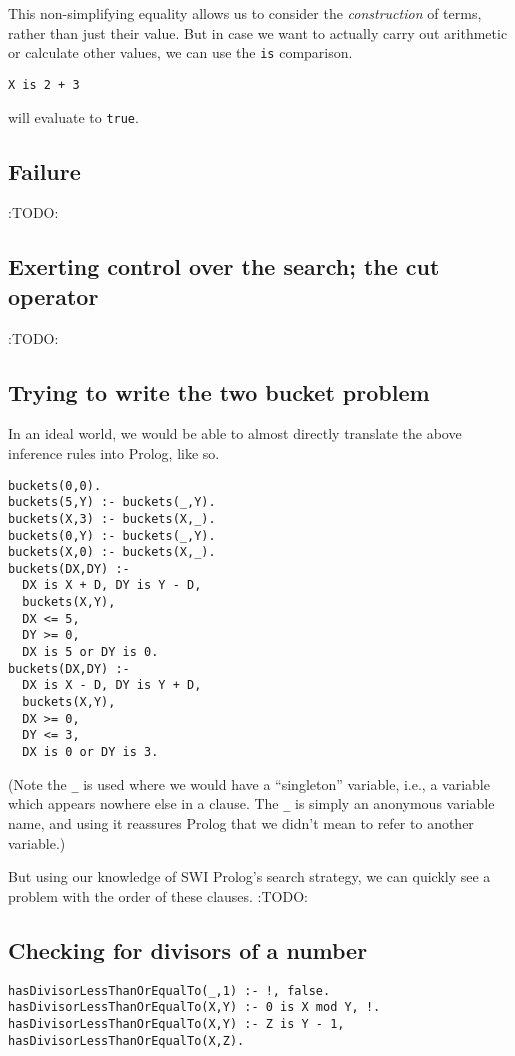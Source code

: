 \documentclass[11pt]{article}
\begin{document}
This non-simplifying equality allows us to consider
the \emph{construction} of terms, rather than just their value.
But in case we want to actually carry out arithmetic
or calculate other values,
we can use the \texttt{is} comparison.
\begin{verbatim}
X is 2 + 3
\end{verbatim}
will evaluate to \texttt{true}.

\subsection{Failure}
\label{sec:org929b371}
:TODO:

\subsection{Exerting control over the search; the cut operator}
\label{sec:org8ddaa0a}
:TODO:

\subsection{Trying to write the two bucket problem}
\label{sec:org4614fb2}
In an ideal world, we would be able to almost directly translate
the above inference rules into Prolog, like so.
\begin{verbatim}
buckets(0,0).
buckets(5,Y) :- buckets(_,Y).
buckets(X,3) :- buckets(X,_).
buckets(0,Y) :- buckets(_,Y).
buckets(X,0) :- buckets(X,_).
buckets(DX,DY) :-
  DX is X + D, DY is Y - D,
  buckets(X,Y),
  DX <= 5,
  DY >= 0,
  DX is 5 or DY is 0.
buckets(DX,DY) :-
  DX is X - D, DY is Y + D,
  buckets(X,Y),
  DX >= 0,
  DY <= 3,
  DX is 0 or DY is 3.
\end{verbatim}
(Note the \texttt{\_} is used where we would have a “singleton” variable,
i.e., a variable which appears nowhere else in a clause.
The \texttt{\_} is simply an anonymous variable name, and using it
reassures Prolog that we didn't mean to refer to another variable.)

But using our knowledge of SWI Prolog's search strategy,
we can quickly see a problem with the order of these clauses.
:TODO:

\subsection{Checking for divisors of a number}
\label{sec:org6e80478}
\begin{verbatim}
hasDivisorLessThanOrEqualTo(_,1) :- !, false.
hasDivisorLessThanOrEqualTo(X,Y) :- 0 is X mod Y, !.
hasDivisorLessThanOrEqualTo(X,Y) :- Z is Y - 1, hasDivisorLessThanOrEqualTo(X,Z).
\end{verbatim}
\end{document}
